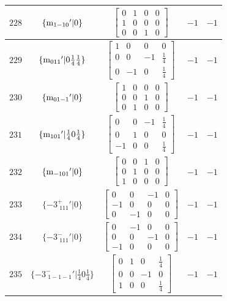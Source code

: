 \documentclass[fleqn,8pt]{jsarticle}
\begin{document}
\begin{longtable}{ccccc}
$ 228 $ & $ \{{\rm m}_{1-10}{}'|0\} $ & $ \begin{bmatrix} 0 & 1 & 0 & 0 \\ 1 & 0 & 0 & 0 \\ 0 & 0 & 1 & 0 \end{bmatrix} $ & $ -1 $ & $ -1 $ \\ \hline
$ 229 $ & $ \{{\rm m}_{011}{}'|0 \frac{1}{4} \frac{1}{4}\} $ & $ \begin{bmatrix} 1 & 0 & 0 & 0 \\ 0 & 0 & -1 & \frac{1}{4} \\ 0 & -1 & 0 & \frac{1}{4} \end{bmatrix} $ & $ -1 $ & $ -1 $ \\ \hline
$ 230 $ & $ \{{\rm m}_{01-1}{}'|0\} $ & $ \begin{bmatrix} 1 & 0 & 0 & 0 \\ 0 & 0 & 1 & 0 \\ 0 & 1 & 0 & 0 \end{bmatrix} $ & $ -1 $ & $ -1 $ \\ \hline
$ 231 $ & $ \{{\rm m}_{101}{}'|\frac{1}{4} 0 \frac{1}{4}\} $ & $ \begin{bmatrix} 0 & 0 & -1 & \frac{1}{4} \\ 0 & 1 & 0 & 0 \\ -1 & 0 & 0 & \frac{1}{4} \end{bmatrix} $ & $ -1 $ & $ -1 $ \\ \hline
$ 232 $ & $ \{{\rm m}_{-101}{}'|0\} $ & $ \begin{bmatrix} 0 & 0 & 1 & 0 \\ 0 & 1 & 0 & 0 \\ 1 & 0 & 0 & 0 \end{bmatrix} $ & $ -1 $ & $ -1 $ \\ \hline
$ 233 $ & $ \{-3^{+}_{\,\,111}{}'|0\} $ & $ \begin{bmatrix} 0 & 0 & -1 & 0 \\ -1 & 0 & 0 & 0 \\ 0 & -1 & 0 & 0 \end{bmatrix} $ & $ -1 $ & $ -1 $ \\ \hline
$ 234 $ & $ \{-3^{-}_{\,\,111}{}'|0\} $ & $ \begin{bmatrix} 0 & -1 & 0 & 0 \\ 0 & 0 & -1 & 0 \\ -1 & 0 & 0 & 0 \end{bmatrix} $ & $ -1 $ & $ -1 $ \\ \hline
$ 235 $ & $ \{-3^{-}_{\,\,1-1-1}{}'|\frac{1}{4} 0 \frac{1}{4}\} $ & $ \begin{bmatrix} 0 & 1 & 0 & \frac{1}{4} \\ 0 & 0 & -1 & 0 \\ 1 & 0 & 0 & \frac{1}{4} \end{bmatrix} $ & $ -1 $ & $ -1 $ \\ \hline

\end{longtable}
\end{document}
